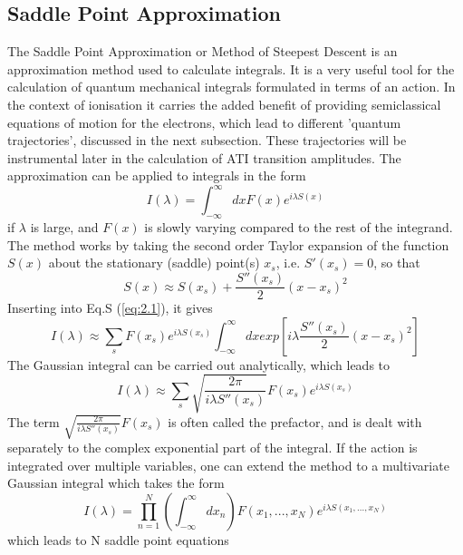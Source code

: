 \documentclass[11pt]{article}
\numberwithin{equation}{section}
\begin{document}
\subsection{Saddle Point Approximation}\label{ch:SPA}
The Saddle Point Approximation or Method of Steepest Descent is an approximation method used to calculate integrals\cite{maxwell_2019_strongfield}. It is a very useful tool for the calculation of quantum mechanical integrals formulated in terms of an action. In the context of ionisation it carries the added benefit of providing semiclassical equations of motion for the electrons, which lead to different 'quantum trajectories', discussed in the next subsection. These trajectories will be instrumental later in the calculation of ATI transition amplitudes. 
\nelwline
The approximation can be applied to integrals in the form 
\begin{equation} \label{eq:2.1}
    I(\lambda) = \int_{-\infty}^{\infty} dx F(x) e^{i\lambda S(x)}
\end{equation}
if $\lambda$ is large, and $F(x)$ is slowly varying compared to the rest of the integrand. The method works by taking the second order Taylor expansion of the function $S(x)$ about the stationary (saddle) point(s) $x_s$, i.e. $S'(x_s) = 0$, so that
\begin{equation}
    S(x) \approx S(x_s) + \frac{S''(x_s)}{2}(x-x_s)^2
\end{equation}
Inserting into Eq.S (\ref{eq:2.1}), it gives
\begin{equation}
    I(\lambda) \approx \sum_s F(x_s) e^{i\lambda S(x_s)} \int_{-\infty}^{\infty} dx  exp[i\lambda \frac{S''(x_s)}{2}(x-x_s)^2]
\end{equation}
The Gaussian integral can be carried out analytically, which leads to
\begin{equation} \label{eq:I_lambda}
    I(\lambda) \approx \sum_s \sqrt{\frac{2\pi}{i\lambda S''(x_s)}} F(x_s) e^{i\lambda S(x_s)}
\end{equation}
The term $\sqrt{\frac{2\pi}{i\lambda S''(x_s)}} F(x_s)$ is often called the prefactor, and is dealt with separately to the complex exponential part of the integral. If the action is integrated over multiple variables, one can extend the method to a multivariate Gaussian integral which takes the form
\begin{equation} \label{eq:2.5}
    I(\lambda) = \prod_{n=1}^N \left (\int_{-\infty}^{\infty} dx_n \right ) F(x_1,...,x_N) e^{i\lambda S(x_1,...,x_N)}
\end{equation}
which leads to N saddle point equations
\end{document}
